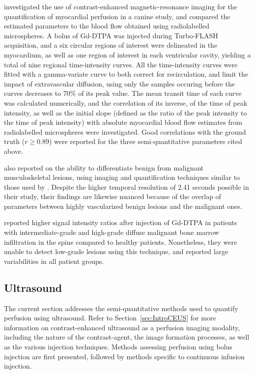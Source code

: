 \citet{Wilke:1993wu} investigated the use of contrast-enhanced magnetic-resonance imaging for the quantification of myocardial perfusion in a canine study, and compared the estimated parameters to the blood flow obtained using radiolabelled microspheres.
A bolus of Gd-DTPA was injected during Turbo-FLASH acquisition, and a six circular regions of interest were delineated in the myocardium, as well as one region of interest in each ventricular cavity, yielding a total of nine regional time-intensity curves.
All the time-intensity curves were fitted with a gamma-variate curve to both correct for recirculation, and limit the impact of extravascular diffusion, using only the samples occuring before the curves decreases to 70\% of its peak value.
The mean transit time of each curve was calculated numerically, and the correlation of its inverse, of the time of peak intensity, as well as the initial slope (defined as the ratio of the peak intensity to the time of peak intensity) with absolute myocardial blood flow estimates from radiolabelled microspheres were investigated.
Good correlations with the ground truth ($r \geq 0.89$) were reported for the three semi-quantitative parameters cited above.

\citet{Verstraete:1994iw} also reported on the ability to differentiate benign from malignant musculoskeletal lesions, using imaging and quantification techniques similar to those used by \citet{Erlemann:1989ib}.
Despite the higher temporal resolution of 2.41 seconds possible in their study, their findings are likewise nuanced because of the overlap of parameters between highly vascularized benign lesions and the malignant ones. %

\citet{Baur:1997ur} reported higher signal intensity ratios after injection of Gd-DTPA in patients with intermediate-grade and high-grade diffuse malignant bone marrow infiltration in the spine compared to healthy patients.
Nonetheless, they were unable to detect low-grade lesions using this technique, and reported large variabilities in all patient groups. %

\subsection{Ultrasound}
\label{sec:SQCEUS}
The current section addresses the semi-quantitative methods used to quantify perfusion using ultrasound.
Refer to Section~\ref{sec:IntroCEUS} for more information on contrast-enhanced ultrasound as a perfusion imaging modality, including the nature of the contrast-agent, the image formation processes, as well as the various injection techniques.
Methods assessing perfusion using bolus injection are first presented, followed by methods specific to continuous infusion injection.

